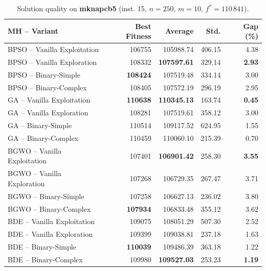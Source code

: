 \begin{table}[htbp]
  \centering
  \small
  \caption{Solution quality on \textbf{mknapcb5} (inst. 15, $n=250$, $m=10$, $f^*=110\,841$).}
  \label{tab:calidad_mknapcb5_15}
  \begin{tabular}{lrrrr}
    \toprule
    \textbf{MH -- Variant} &
    \textbf{Best Fitness} &
    \textbf{Average} &
    \textbf{Std.} &
    \textbf{Gap (\%)} \\
    \midrule
    BPSO -- Vanilla Exploitation &         106755 &        105988.74 & 406.15 &         4.38 \\
    BPSO -- Vanilla Exploration  &         108332 & \textbf{107597.61} & 329.14 & \textbf{2.93} \\
    BPSO -- Binary-Simple        & \textbf{108424} &        107519.48 & 334.14 &         3.00 \\
    BPSO -- Binary-Complex       &         108405 &        107572.19 & 296.19 &         2.95 \\
    \midrule
    GA -- Vanilla Exploitation   & \textbf{110638} & \textbf{110345.13} & 163.74 & \textbf{0.45} \\
    GA -- Vanilla Exploration    &         108281 &        107519.61 & 358.12 &         3.00 \\
    GA -- Binary-Simple          &         110514 &        109117.52 & 624.95 &         1.55 \\
    GA -- Binary-Complex         &         110459 &        110060.10 & 215.39 &         0.70 \\
    \midrule
    BGWO -- Vanilla Exploitation &         107401 & \textbf{106901.42} & 258.30 & \textbf{3.55} \\
    BGWO -- Vanilla Exploration  &         107268 &        106729.35 & 267.47 &         3.71 \\
    BGWO -- Binary-Simple        &         107258 &        106627.13 & 236.02 &         3.80 \\
    BGWO -- Binary-Complex       & \textbf{107934} &        106833.48 & 355.12 &         3.62 \\
    \midrule
    BDE -- Vanilla Exploitation  &         109075 &        108051.29 & 507.30 &         2.52 \\
    BDE -- Vanilla Exploration   &         109399 &        109038.81 & 237.18 &         1.63 \\
    BDE -- Binary-Simple         & \textbf{110039} &        109486.39 & 363.18 &         1.22 \\
    BDE -- Binary-Complex        &         109980 & \textbf{109527.03} & 253.23 & \textbf{1.19} \\
    \bottomrule
  \end{tabular}
\end{table}
